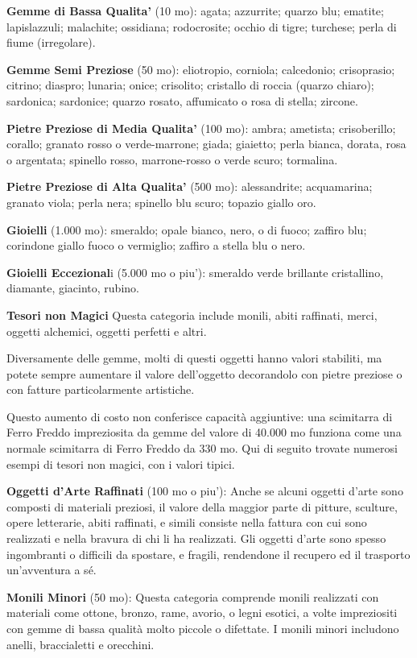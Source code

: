 \documentclass[a4paper,11pt,twoside,openany]{book}
\begin{document}
\textbf{Gemme di Bassa Qualita'} (10 mo): agata; azzurrite; quarzo blu; ematite; lapislazzuli; malachite; ossidiana; rodocrosite; occhio di tigre; turchese; perla di fiume (irregolare).

\textbf{Gemme Semi Preziose} (50 mo): eliotropio, corniola; calcedonio; crisoprasio; citrino; diaspro; lunaria; onice; crisolito; cristallo di roccia (quarzo chiaro); sardonica; sardonice; quarzo rosato, affumicato o rosa di stella; zircone.

\textbf{Pietre Preziose di Media Qualita'} (100 mo): ambra; ametista;
crisoberillo; corallo; granato rosso o verde-marrone; giada; giaietto;
perla bianca, dorata, rosa o argentata; spinello rosso, marrone-rosso
o verde scuro; tormalina.

\textbf{Pietre Preziose di Alta Qualita'} (500 mo): alessandrite; acquamarina; granato viola; perla nera; spinello blu scuro; topazio giallo oro.

\textbf{Gioielli} (1.000 mo): smeraldo; opale bianco, nero, o di fuoco; zaffiro blu; corindone giallo fuoco o vermiglio; zaffiro a stella blu o nero.

\textbf{Gioielli Eccezional}i (5.000 mo o piu'): smeraldo verde brillante cristallino, diamante, giacinto, rubino.

\textbf{Tesori non Magici} Questa categoria include monili, abiti raffinati, merci, oggetti alchemici, oggetti perfetti e altri.

Diversamente delle gemme, molti di questi oggetti hanno valori stabiliti, ma potete sempre aumentare il valore dell'oggetto decorandolo con pietre preziose o con fatture particolarmente artistiche.

Questo aumento di costo non conferisce capacità aggiuntive: una scimitarra di Ferro Freddo impreziosita da gemme del valore di 40.000 mo funziona come una normale scimitarra di Ferro Freddo da 330 mo. Qui di seguito trovate numerosi esempi di tesori non magici, con i valori tipici.

\textbf{Oggetti d'Arte Raffinati} (100 mo o piu'): Anche se alcuni oggetti d'arte sono composti di materiali preziosi, il valore della maggior parte di pitture, sculture, opere letterarie, abiti raffinati, e simili consiste nella fattura con cui sono realizzati e nella bravura di chi li ha realizzati. Gli oggetti d'arte sono spesso ingombranti o difficili da spostare, e fragili, rendendone il recupero ed il trasporto un'avventura a sé.

\textbf{Monili Minori} (50 mo): Questa categoria comprende monili realizzati con materiali come ottone, bronzo, rame, avorio, o legni esotici, a volte impreziositi con gemme di bassa qualità molto piccole o difettate. I monili minori includono anelli, braccialetti e orecchini.
\end{document}
